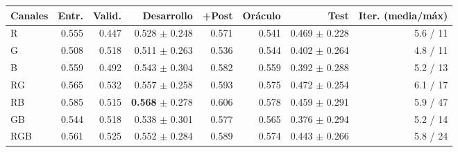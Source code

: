 \footnotesize
\begin{tabular}{lrrrrrrr}
\toprule
Canales & Entr. & Valid. & Desarrollo & +Post & Oráculo & Test & Iter. (media/máx) \\
\midrule
R & 0.555 & 0.447 & 0.528 $\pm$ 0.248 & 0.571 & 0.541 & 0.469 $\pm$ 0.228 & 5.6 / 11 \\
G & 0.508 & 0.518 & 0.511 $\pm$ 0.263 & 0.536 & 0.544 & 0.402 $\pm$ 0.264 & 4.8 / 11 \\
B & 0.559 & 0.492 & 0.543 $\pm$ 0.304 & 0.582 & 0.559 & 0.392 $\pm$ 0.288 & 5.2 / 13 \\
RG & 0.565 & 0.532 & 0.557 $\pm$ 0.258 & 0.593 & 0.575 & 0.472 $\pm$ 0.254 & 6.1 / 17 \\
RB & 0.585 & 0.515 & \textbf{0.568} $\pm$ 0.278 & 0.606 & 0.578 & 0.459 $\pm$ 0.291 & 5.9 / 47 \\
GB & 0.544 & 0.518 & 0.538 $\pm$ 0.301 & 0.577 & 0.565 & 0.376 $\pm$ 0.294 & 5.2 / 14 \\
RGB & 0.561 & 0.525 & 0.552 $\pm$ 0.284 & 0.589 & 0.574 & 0.443 $\pm$ 0.266 & 5.8 / 24 \\
\bottomrule
\end{tabular}
